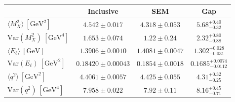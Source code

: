 \begin{tabular}{l c c c}
\toprule
 & Inclusive & SEM & Gap \\
\midrule
$\langle M_X^2\rangle\ [\mathrm{GeV}^2]$ & $4.542\pm0.017$ & $4.318\pm0.053$ & $5.68^{+0.40}_{-0.32}$ \\
$\mathrm{Var}(M_X^2)\ [\mathrm{GeV}^4]$ & $1.653\pm0.074$ & $1.22\pm0.24$ & $2.32^{+0.80}_{-0.88}$ \\
$\langle E_\ell\rangle\ [\mathrm{GeV}]$ & $1.3906\pm0.0010$ & $1.4081\pm0.0047$ & $1.302^{+0.028}_{-0.031}$ \\
$\mathrm{Var}(E_\ell)\ [\mathrm{GeV}^2]$ & $0.18420\pm0.00043$ & $0.1854\pm0.0018$ & $0.1685^{+0.0074}_{-0.0112}$ \\
$\langle q^2\rangle\ [\mathrm{GeV}^2]$ & $4.4061\pm0.0057$ & $4.425\pm0.055$ & $4.31^{+0.32}_{-0.25}$ \\
$\mathrm{Var}(q^2)\ [\mathrm{GeV}^4]$ & $7.958\pm0.022$ & $7.92\pm0.11$ & $8.16^{+0.45}_{-0.71}$ \\
\bottomrule
\end{tabular}
